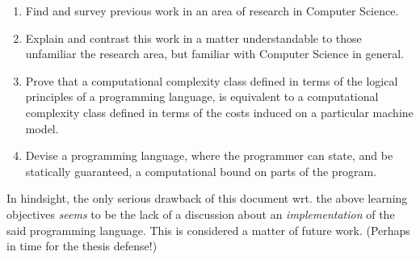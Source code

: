 \begin{enumerate}[label=(\alph*)]

\item Find and survey previous work in an area of research in Computer Science.

\item Explain and contrast this work in a matter understandable to those
unfamiliar the research area, but familiar with Computer Science in general. 

\item Prove that a computational complexity class defined in terms of the
logical principles of a programming language, is equivalent to a computational
complexity class defined in terms of the costs induced on a particular machine
model. 

\item Devise a programming language, where the programmer can state, and be
statically guaranteed, a computational bound on parts of the program.

\end{enumerate}

In hindsight, the only serious drawback of this document wrt. the above
learning objectives \emph{seems} to be the lack of a discussion about an
\emph{implementation} of the said programming language. This is considered a
matter of future work.  (Perhaps in time for the thesis defense!)
